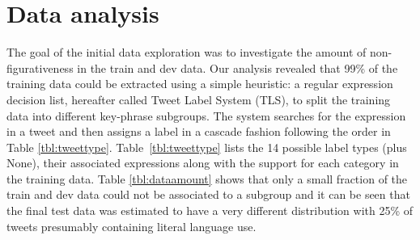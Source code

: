 \documentclass[11pt,letterpaper]{article}
\begin{document}



\section{Data analysis}\label{sec:data}
\label{sec::dataanalysis}
The goal of the initial data exploration was to investigate the amount of non-figurativeness in the train and dev data. %
Our analysis revealed that 99\% of the training data could be extracted using a simple heuristic:  a regular expression decision list, hereafter called Tweet Label System (TLS),  to split the training data into different key-phrase subgroups. The system searches for the expression in a tweet and then assigns a label in a cascade fashion following the order in Table \ref{tbl:tweettype}. %
Table~\ref{tbl:tweettype} lists the 14 possible label types (plus {\sc None}), their associated expressions along with the support for each category in the training data. Table \ref{tbl:dataamount} shows that only a small fraction of the train and dev data could not be associated to a subgroup and it can be seen that the final test data was estimated to have a very different distribution with 25\% of tweets presumably containing literal language use.
\end{document}
